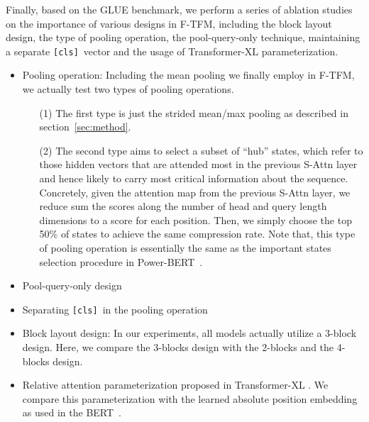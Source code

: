 \documentclass{article}
\theoremstyle{custom}
\newcommand{\cls}{\texttt{[cls]}~}
\begin{document}
Finally, based on the GLUE benchmark, we perform a series of ablation studies on the importance of various designs in F-TFM, including the block layout design, the type of pooling operation, the pool-query-only technique, maintaining a separate \cls vector and the usage of Transformer-XL parameterization.
\begin{itemize}[leftmargin=*]
	\item Pooling operation: Including the mean pooling we finally employ in F-TFM, we actually test two types of pooling operations.
	\begin{itemize}
		\item[(1)] The first type is just the strided mean/max pooling as described in section~\ref{sec:method}.
		\item[(2)] The second type aims to select a subset of ``hub'' states, which refer to those hidden vectors that are attended most in the previous S-Attn layer and hence likely to carry most critical information about the sequence.
		Concretely, given the attention map from the previous S-Attn layer, we reduce sum the scores along the number of head and query length dimensions to a score for each position.
		Then, we simply choose the top 50\% of states to achieve the same compression rate.
		Note that, this type of pooling operation is essentially the same as the important states selection procedure in Power-BERT~\cite{goyal2020power}.
	\end{itemize}
	\item Pool-query-only design
	\item Separating \cls in the pooling operation
	\item Block layout design: In our experiments, all models actually utilize a 3-block design. Here, we compare the 3-blocks design with the 2-blocks and the 4-blocks design. 
	\item Relative attention parameterization proposed in Transformer-XL \cite{dai2019transformer}.
	We compare this parameterization with the learned absolute position embedding as used in the BERT~\cite{devlin2018bert}.
\end{itemize}
\end{document}
